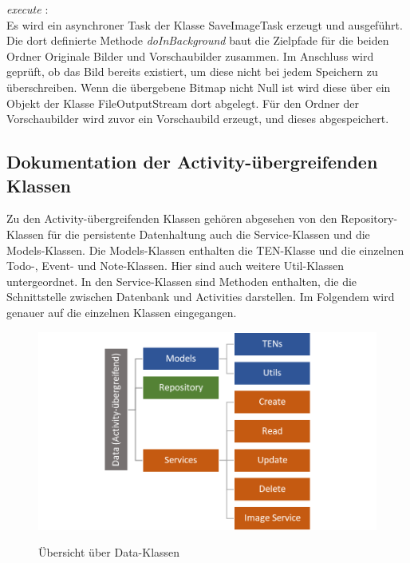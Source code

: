\textit{ execute }:\\
Es wird ein asynchroner Task der Klasse SaveImageTask erzeugt und ausgeführt. Die dort definierte Methode \textit{doInBackground} baut die Zielpfade für die beiden Ordner Originale Bilder und Vorschaubilder zusammen. Im Anschluss wird geprüft, ob das Bild bereits existiert, um diese nicht bei jedem Speichern zu überschreiben. Wenn die übergebene Bitmap nicht Null ist wird diese über ein Objekt der Klasse FileOutputStream dort abgelegt. Für den Ordner der Vorschaubilder wird zuvor ein Vorschaubild erzeugt, und dieses abgespeichert.

\newpage
\subsection{Dokumentation der Activity-übergreifenden Klassen}

Zu den Activity-übergreifenden Klassen gehören abgesehen von den Repository-Klassen für die persistente Datenhaltung auch die Service-Klassen und die Models-Klassen. Die Models-Klassen enthalten die TEN-Klasse und die einzelnen Todo-, Event- und Note-Klassen. Hier sind auch weitere Util-Klassen untergeordnet. In den Service-Klassen sind Methoden enthalten, die die Schnittstelle zwischen Datenbank und Activities darstellen. Im Folgendem wird genauer auf die einzelnen Klassen eingegangen.

\begin{figure}[H]
\centering
\begin{minipage}[t]{1\textwidth} %
\caption{Übersicht über Data-Klassen} %
\includegraphics[width=1\textwidth]{img/StrukturDataKlassen}\\ %
\end{minipage}
\end{figure}

